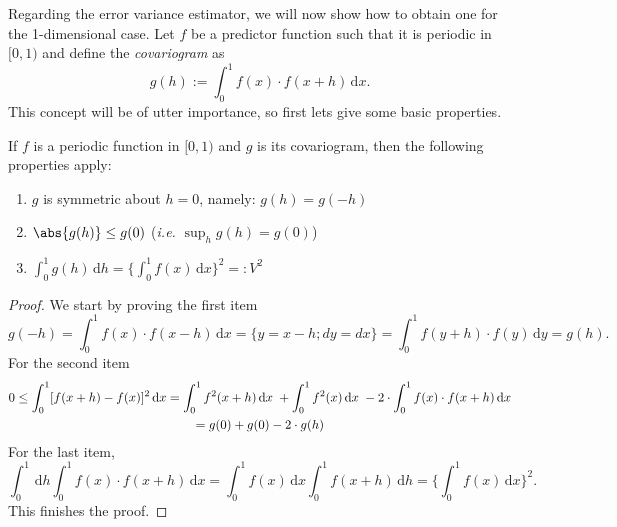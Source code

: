 
Regarding the error variance estimator, we will now show how to obtain one for the 1-dimensional case. Let $f$ be a predictor function such that it is periodic in $[0,1)$  %
and define the \textit{covariogram} as
\begin{equation} \label{eqCovariograma}
    g(h) := \int_0^1 f(x) \cdot f(x+h) \,\mathrm{d}x.
\end{equation}
This concept will be of utter importance, so first lets give some basic properties.\\

\begin{Prop}
    If $f$ is a periodic function in $[0,1)$ and $g$ is its covariogram, then the following properties apply:
    \begin{enumerate}
        \item $g$ is symmetric about $h=0$, namely: $g(h) = g(-h)$
        \item $\abs{g(h)} \leq g(0)$ (\textit{i.e.} $\sup_{h}{g(h)} = g(0)$)
        \item $\int_0^1 g(h) \,\mathrm{d}h = \Bigg\{ \int_0^1 f(x) \,\mathrm{d}x \Bigg\}^2 =: V^2$
    \end{enumerate}
\end{Prop}
\begin{proof} 
We start by proving the first item
$$ g(-h) = \int_0^1 f(x) \cdot f(x-h) \,\mathrm{d}x =\{ y=x-h; dy=dx \}= \int_0^1 f(y+h) \cdot f(y) \,\mathrm{d}y = g(h).$$
For the second item
\begin{multline*}
        0 \leq \int_0^1 [ f(x+h) - f(x) ]^2 \,\mathrm{d}x = \int_0^1 f^2(x+h) \,\mathrm{d}x \hspace{1mm} + \int_0^1 f^2(x) \,\mathrm{d}x \hspace{1mm} - 2\cdot \int_0^1 f(x) \cdot f(x+h) \,\mathrm{d}x \\
        = g(0) + g(0) -2\cdot g(h)
    \end{multline*} 
For the last item, 
$$ \int_0^1 \,\mathrm{d}h \int_0^1 f(x) \cdot f(x+h) \,\mathrm{d}x = \int_0^1 f(x) \,\mathrm{d}x \int_0^1 f(x+h) \,\mathrm{d}h = \Bigg\{ \int_0^1 f(x) \,\mathrm{d}x \Bigg\}^2.$$
This finishes the proof.
\end{proof}

